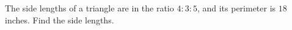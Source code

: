 The side lengths of a triangle are in the ratio $4:3:5$, and its perimeter is $18$ inches. Find the side lengths.

